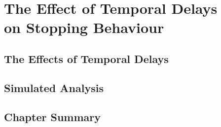
\chapter[The Effect of Temporal Delays on Stopping Behaviour]{The Effect of Temporal Delays\\on Stopping Behaviour}\label{chap:temporal}

\section{The Effects of Temporal Delays}

\section{Simulated Analysis}

\section{Chapter Summary}